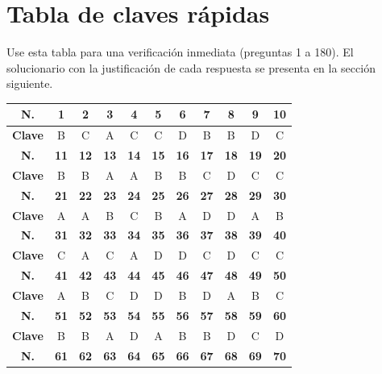 \newpage
\section*{Tabla de claves rápidas}

\noindent Use esta tabla para una verificación inmediata (preguntas 1 a 180). El solucionario con la justificación de cada respuesta se presenta en la sección siguiente.

\vspace{0.35cm}
\begin{center}
\footnotesize
\renewcommand{\arraystretch}{1.25}
\begin{tabular}{|c|c|c|c|c|c|c|c|c|c|c|}
\hline
\textbf{N.} & \textbf{1} & \textbf{2} & \textbf{3} & \textbf{4} & \textbf{5} & \textbf{6} & \textbf{7} & \textbf{8} & \textbf{9} & \textbf{10} \\
\hline
\textbf{Clave} & B & C & A & C & C & D & B & B & D & C \\
\hline
\textbf{N.} & \textbf{11} & \textbf{12} & \textbf{13} & \textbf{14} & \textbf{15} & \textbf{16} & \textbf{17} & \textbf{18} & \textbf{19} & \textbf{20} \\
\hline
\textbf{Clave} & B & B & A & A & B & B & C & D & C & C \\
\hline
\textbf{N.} & \textbf{21} & \textbf{22} & \textbf{23} & \textbf{24} & \textbf{25} & \textbf{26} & \textbf{27} & \textbf{28} & \textbf{29} & \textbf{30} \\
\hline
\textbf{Clave} & A & A & B & C & B & A & D & D & A & B \\
\hline
\textbf{N.} & \textbf{31} & \textbf{32} & \textbf{33} & \textbf{34} & \textbf{35} & \textbf{36} & \textbf{37} & \textbf{38} & \textbf{39} & \textbf{40} \\
\hline
\textbf{Clave} & C & A & C & A & D & D & C & D & C & C \\
\hline
\textbf{N.} & \textbf{41} & \textbf{42} & \textbf{43} & \textbf{44} & \textbf{45} & \textbf{46} & \textbf{47} & \textbf{48} & \textbf{49} & \textbf{50} \\
\hline
\textbf{Clave} & A & B & C & D & D & B & D & A & B & C \\
\hline
\textbf{N.} & \textbf{51} & \textbf{52} & \textbf{53} & \textbf{54} & \textbf{55} & \textbf{56} & \textbf{57} & \textbf{58} & \textbf{59} & \textbf{60} \\
\hline
\textbf{Clave} & B & B & A & D & A & B & B & D & C & D \\
\hline
\textbf{N.} & \textbf{61} & \textbf{62} & \textbf{63} & \textbf{64} & \textbf{65} & \textbf{66} & \textbf{67} & \textbf{68} & \textbf{69} & \textbf{70} \\

\end{tabular}
\end{center}
